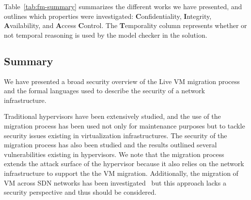 Table~\ref{tab:fm-summary} summarizes the different works we have presented, and outlines which properties were investigated: \textbf{C}onfidentiality, \textbf{I}ntegrity, \textbf{A}vailability, and \textbf{A}ccess \textbf{C}ontrol. 
The \textbf{T}emporality column represents whether or not temporal reasoning is used by the model checker in the solution.
\begin{table}[ht]
\caption{Summary of formal models}
\label{tab:fm-summary}
\end{table}

\subsection{Summary}
We have presented a broad security overview of the Live VM migration process and the formal languages used to describe the security of a network infrastructure.

Traditional hypervisors have been extensively studied, and the use of the migration process has been used not only for maintenance purposes but to tackle security issues existing in virtualization infrastructures.
The security of the migration process has also been studied and the results outlined several vulnerabilities existing in hypervisors.
We note that the migration process extends the attack surface of the hypervisor because it also relies on the network infrastructure to support the the VM migration.
Additionally, the migration of VM across SDN networks has been investigated~\cite{Datacenters2014,Lin2013,Ibn-Khedher2015} but this approach lacks a security perspective and thus should be considered.


